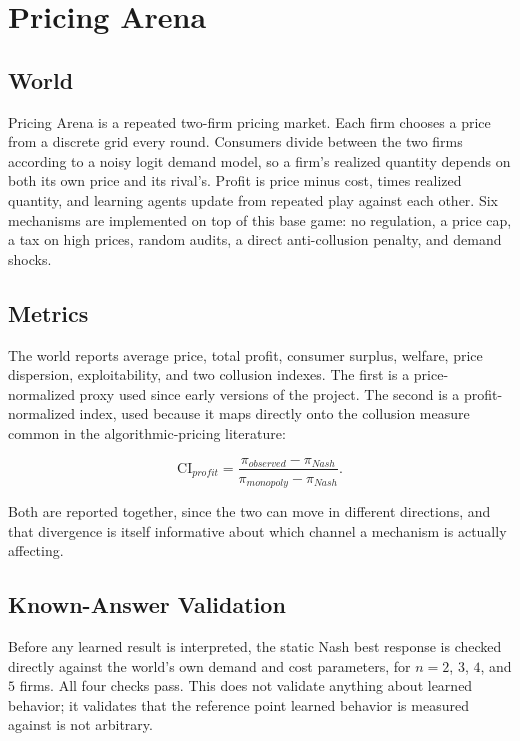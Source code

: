 \documentclass[11pt]{article}
\begin{document}
\section{Pricing Arena}

\subsection{World}

Pricing Arena is a repeated two-firm pricing market. Each firm chooses a price
from a discrete grid every round. Consumers divide between the two firms
according to a noisy logit demand model, so a firm's realized quantity depends
on both its own price and its rival's. Profit is price minus cost, times
realized quantity, and learning agents update from repeated play against each
other. Six mechanisms are implemented on top of this base game: no regulation,
a price cap, a tax on high prices, random audits, a direct anti-collusion
penalty, and demand shocks.

\subsection{Metrics}

The world reports average price, total profit, consumer surplus, welfare, price
dispersion, exploitability, and two collusion indexes. The first is a
price-normalized proxy used since early versions of the project. The second is
a profit-normalized index, used because it maps directly onto the collusion
measure common in the algorithmic-pricing literature:

\begin{equation}
  \mathrm{CI}_{profit}
  =
  \frac{\pi_{observed} - \pi_{Nash}}
       {\pi_{monopoly} - \pi_{Nash}}.
\end{equation}

Both are reported together, since the two can move in different directions, and
that divergence is itself informative about which channel a mechanism is
actually affecting.

\subsection{Known-Answer Validation}

Before any learned result is interpreted, the static Nash best response is
checked directly against the world's own demand and cost parameters, for
\(n=2\), \(3\), \(4\), and \(5\) firms. All four checks pass. This does not
validate anything about learned behavior; it validates that the reference point
learned behavior is measured against is not arbitrary.
\end{document}
